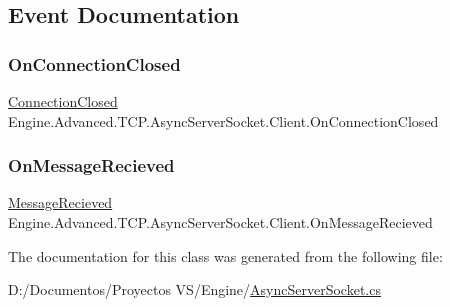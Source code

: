 \subsection{Event Documentation}
\mbox{\label{class_engine_1_1_advanced_1_1_t_c_p_1_1_async_server_socket_1_1_client_a0b74722567ccb974f3fa2dbef12f5854}} 
\subsubsection{\texorpdfstring{OnConnectionClosed}{OnConnectionClosed}}
{\footnotesize\ttfamily \mbox{\hyperlink{class_engine_1_1_advanced_1_1_t_c_p_1_1_async_server_socket_1_1_client_a773e682fb931f02885fd915baffa9600}{Connection\+Closed}} Engine.\+Advanced.\+T\+C\+P.\+Async\+Server\+Socket.\+Client.\+On\+Connection\+Closed}

\mbox{\label{class_engine_1_1_advanced_1_1_t_c_p_1_1_async_server_socket_1_1_client_ad271460b7d07d4b467a8a9ea3b89864e}} 
\subsubsection{\texorpdfstring{OnMessageRecieved}{OnMessageRecieved}}
{\footnotesize\ttfamily \mbox{\hyperlink{class_engine_1_1_advanced_1_1_t_c_p_1_1_async_server_socket_1_1_client_aec5803c220dbc6dbe3cabc218dcfde50}{Message\+Recieved}} Engine.\+Advanced.\+T\+C\+P.\+Async\+Server\+Socket.\+Client.\+On\+Message\+Recieved}



The documentation for this class was generated from the following file\+:\begin{DoxyCompactItemize}
\item 
D\+:/\+Documentos/\+Proyectos V\+S/\+Engine/\mbox{\hyperlink{_async_server_socket_8cs}{Async\+Server\+Socket.\+cs}}\end{DoxyCompactItemize}
